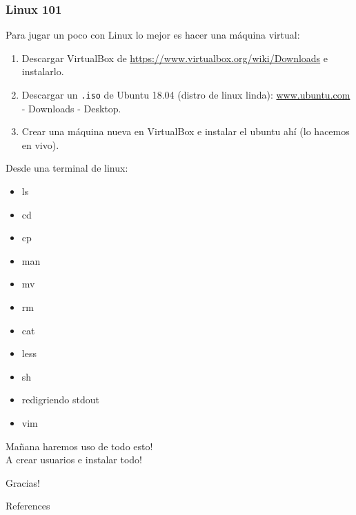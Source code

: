 \documentclass[]{beamer}
\begin{document}
\begin{frame}
\frametitle{Linux 101}
Para jugar un poco con Linux lo mejor es hacer una máquina virtual:

\begin{enumerate}
  \item Descargar VirtualBox de \url{https://www.virtualbox.org/wiki/Downloads} e instalarlo.
  \item Descargar un \Verb=.iso= de Ubuntu 18.04 (distro de linux linda): \url{www.ubuntu.com} - Downloads - Desktop.
  \item Crear una máquina nueva en VirtualBox e instalar el ubuntu ahí (lo hacemos en vivo).
  \end{enumerate}

\end{frame}

\begin{frame}
Desde una terminal de linux:
 \begin{itemize}[<+->]
  \item ls
  \item cd
  \item cp
  \item man
  \item mv
  \item rm
  \item cat
  \item less
  \item sh
  \item redigriendo stdout
  \item vim
 \end{itemize}
\end{frame}

\begin{frame}
\huge{Mañana haremos uso de todo esto!\\A crear usuarios e instalar todo!}

\huge{Gracias!}
\end{frame}

\begin{frame}[allowframebreaks]{References}
\def\newblock{}
% 
% 
\end{frame}
\end{document}
